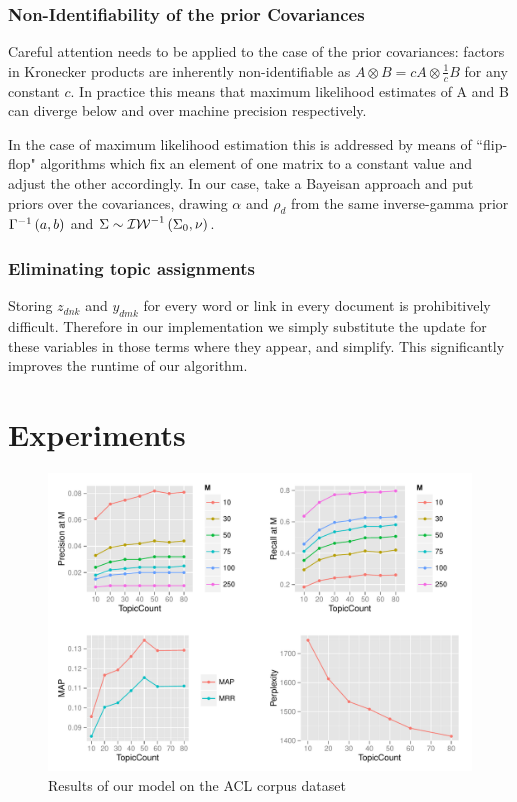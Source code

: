 \subsubsection*{Non-Identifiability of the prior Covariances}
Careful attention needs to be applied to the case of the prior covariances: factors in Kronecker products are inherently non-identifiable as $A \otimes B = c A \otimes \frac{1}{c} B$ for any constant $c$. In practice this means that maximum likelihood estimates of A and B can diverge below and over machine precision respectively.

In the case of maximum likelihood estimation this is addressed by means of ``flip-flop" algorithms\cite{Srivastava2009} which fix an element of one matrix to a constant value and adjust the other accordingly. In our case, take a Bayeisan approach and put priors over the covariances, drawing $\alpha$ and $\rho_d$ from the same inverse-gamma prior ${\Gamma}^{-1}\left(a, b\right)$ and $\Sigma \sim {\mathcal{IW}}^{-1}\left(\Sigma_0, \nu\right)$. 


\subsubsection*{Eliminating topic assignments}
Storing $z_{dnk}$ and $y_{dmk}$ for every word or link in every document is prohibitively difficult. Therefore in our implementation we simply substitute the update for these variables in those terms where they appear, and simplify. This significantly improves the runtime of our algorithm. 
\section{Experiments}

\begin{figure}
  \centering
    \hspace*{-1.5cm}\includegraphics[height=0.40\textheight]{./Chap6/plots/RPlot.pdf}
  \caption{Results of our model on the ACL corpus dataset}
  \label{fig:chap5-fig-self-1}
\end{figure}


